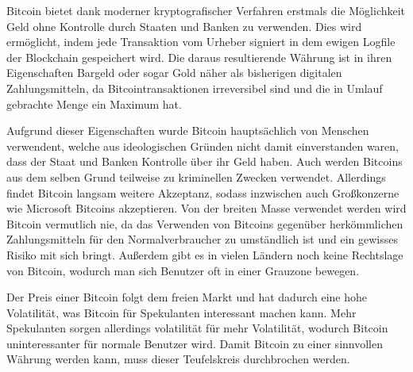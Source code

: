 Bitcoin bietet dank moderner kryptografischer Verfahren erstmals die Möglichkeit Geld ohne Kontrolle durch Staaten und Banken zu verwenden.
Dies wird ermöglicht, indem jede Transaktion vom Urheber signiert in dem ewigen Logfile der Blockchain gespeichert wird.
Die daraus resultierende Währung ist in ihren Eigenschaften Bargeld oder sogar Gold näher als bisherigen digitalen Zahlungsmitteln, da Bitcointransaktionen irreversibel sind und die in Umlauf gebrachte Menge ein Maximum hat.

Aufgrund dieser Eigenschaften wurde Bitcoin hauptsächlich von Menschen verwendent, welche aus ideologischen Gründen nicht damit einverstanden waren, dass der Staat und Banken Kontrolle über ihr Geld haben.
Auch werden Bitcoins aus dem selben Grund teilweise zu kriminellen Zwecken verwendet.
Allerdings findet Bitcoin langsam weitere Akzeptanz, sodass inzwischen auch Großkonzerne wie Microsoft Bitcoins akzeptieren.
Von der breiten Masse verwendet werden wird Bitcoin vermutlich nie, da das Verwenden von Bitcoins gegenüber herkömmlichen Zahlungsmitteln für den Normalverbraucher zu umständlich ist und ein gewisses Risiko mit sich bringt.
Außerdem gibt es in vielen Ländern noch keine Rechtslage von Bitcoin, wodurch man sich Benutzer oft in einer Grauzone bewegen.

Der Preis einer Bitcoin folgt dem freien Markt und hat dadurch eine hohe Volatilität, was Bitcoin für Spekulanten interessant machen kann.
Mehr Spekulanten sorgen allerdings volatilität für mehr Volatilität, wodurch Bitcoin uninteressanter für normale Benutzer wird.
Damit Bitcoin zu einer sinnvollen Währung werden kann, muss dieser Teufelskreis durchbrochen werden.

